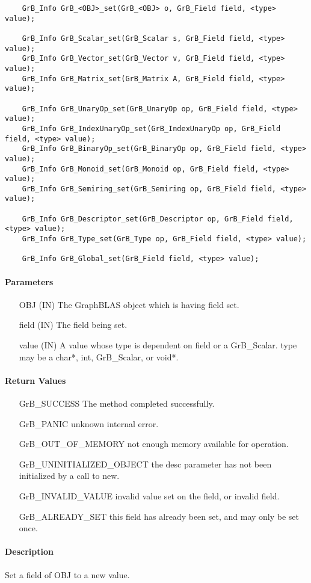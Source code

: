 \begin{verbatim}
    GrB_Info GrB_<OBJ>_set(GrB_<OBJ> o, GrB_Field field, <type> value);

    GrB_Info GrB_Scalar_set(GrB_Scalar s, GrB_Field field, <type> value);
    GrB_Info GrB_Vector_set(GrB_Vector v, GrB_Field field, <type> value);
    GrB_Info GrB_Matrix_set(GrB_Matrix A, GrB_Field field, <type> value);

    GrB_Info GrB_UnaryOp_set(GrB_UnaryOp op, GrB_Field field, <type> value);
    GrB_Info GrB_IndexUnaryOp_set(GrB_IndexUnaryOp op, GrB_Field field, <type> value);
    GrB_Info GrB_BinaryOp_set(GrB_BinaryOp op, GrB_Field field, <type> value);
    GrB_Info GrB_Monoid_set(GrB_Monoid op, GrB_Field field, <type> value);
    GrB_Info GrB_Semiring_set(GrB_Semiring op, GrB_Field field, <type> value);

    GrB_Info GrB_Descriptor_set(GrB_Descriptor op, GrB_Field field, <type> value);
    GrB_Info GrB_Type_set(GrB_Type op, GrB_Field field, <type> value);

    GrB_Info GrB_Global_set(GrB_Field field, <type> value);
\end{verbatim}

\paragraph{Parameters}

\begin{itemize}[leftmargin=1.1in]
    \item[{\sf OBJ}] ({\sf IN}) The GraphBLAS object which is having {\sf field} set.
    \item[{\sf field}] ({\sf IN}) The field being set.
    \item[{\sf value}] ({\sf IN}) A value whose type is dependent on {\sf field} or a {\sf GrB\_Scalar}.
                                 {\sf type} may be a {\sf char*}, {\sf int}, {\sf GrB\_Scalar}, or {\sf void*}.
\end{itemize}

\paragraph{Return Values}

\begin{itemize}[leftmargin=2.1in]
    \item[{\sf GrB\_SUCCESS}]  The method completed successfully.
    \item[{\sf GrB\_PANIC}]             unknown internal error.
    \item[{\sf GrB\_OUT\_OF\_MEMORY}]          not enough memory available for operation.
    \item[{\sf GrB\_UNINITIALIZED\_OBJECT}]          the {\sf desc} parameter has not been
                                        initialized by a call to {\sf new}.
    \item[{\sf GrB\_INVALID\_VALUE}]    invalid value set on the field, or invalid field.
    \item[{\sf GrB\_ALREADY\_SET}]  this field has already been set, and may only be set once. 
    \end{itemize}

\paragraph{Description}

Set a field of {\sf OBJ} to a new value. 